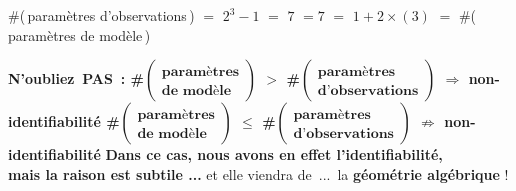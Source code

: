 \begin{frame}{}

\begin{center}
\vskip 0.90cm
\scriptsize
\#(\,param\`etres d'observations\,) $=$ $2^{3}-1$ $=$
\;\textbf{\normalsize\color{red}$7$}
\textbf{\normalsize\color{red}\;$=$\;$7$}\;
$=$ $1+2 \times(3)$ $=$ \#(\,param\`etres de mod\`ele\,)

\vskip 0.2cm

\pause
\normalsize
\vskip -4.5cm
\textbf{\color{titlefontblue}\Huge N'\pause oubliez \pause \,PAS\, :\vskip 0.2cm
\pause\large
{\LARGE\#\scriptsize$\left(\!\begin{array}{c}\textbf{param\`etres} \\ \textbf{de mod\`ele}\end{array}\!\right)$}
$>$
{\LARGE\#\scriptsize$\left(\!\begin{array}{c}\textbf{param\`etres} \\ \textbf{d'observations}\end{array}\!\right)$}
\;$\Rightarrow$\; {\small non-identifiabilit\'e}
\vskip 0.2cm
\pause\large
{\LARGE\#\scriptsize$\left(\!\begin{array}{c}\textbf{param\`etres} \\ \textbf{de mod\`ele}\end{array}\!\right)$}
$\leq$
{\LARGE\#\scriptsize$\left(\!\begin{array}{c}\textbf{param\`etres} \\ \textbf{d'observations}\end{array}\!\right)$}
\;$\not\Rightarrow$\;
{\small{\color{white}non-}identifiabilit\'e}}
\pause
\vskip 0.7cm
\textbf{\normalsize\color{titlefontblue}Dans ce cas, nous avons en effet l'identifiabilit\'e,\\ mais la raison est subtile ...}
\pause
\vskip 0.5cm
{\color{titlefontblue}et elle viendra de \,...\, \pause la \textbf{g\'eom\'etrie alg\'ebrique} !}
\end{center}

\end{frame}
\normalsize

